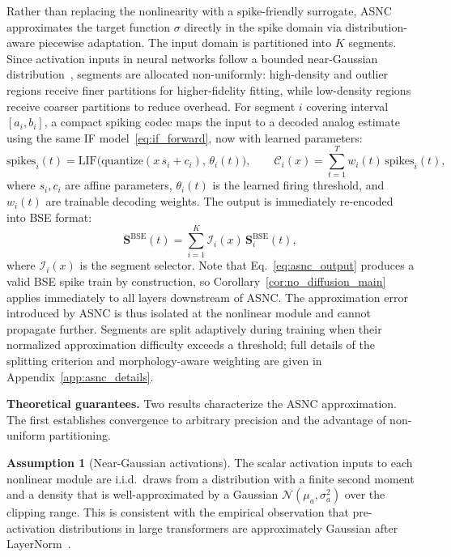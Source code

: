 \documentclass{article}
\theoremstyle{plain}
\theoremstyle{definition}
\newtheorem{assumption}[theorem]{Assumption}
\theoremstyle{remark}
\begin{document}
Rather than replacing the nonlinearity with a spike-friendly surrogate, ASNC
approximates the target function $\sigma$ directly in the spike domain via
distribution-aware piecewise adaptation. The input domain is partitioned into $K$
segments. Since activation inputs in neural networks follow a bounded near-Gaussian
distribution~\citep{he2024understanding,lin2024duquant}, segments are allocated
non-uniformly: high-density and outlier regions receive finer partitions for
higher-fidelity fitting, while low-density regions receive coarser partitions to
reduce overhead. For segment $i$ covering interval $[a_i, b_i]$, a compact spiking
codec maps the input to a decoded analog estimate using the same IF
model~\eqref{eq:if_forward}, now with learned parameters:
\begin{equation}
\label{eq:asnc_codec}
\mathrm{spikes}_i(t)
  = \mathrm{LIF}\!\bigl(\mathrm{quantize}(x\,s_i + c_i),\,\theta_i(t)\bigr),
\qquad
\mathcal{C}_i(x) = \sum_{t=1}^{T} w_i(t)\,\mathrm{spikes}_i(t),
\end{equation}
where $s_i, c_i$ are affine parameters, $\theta_i(t)$ is the learned firing
threshold, and $w_i(t)$ are trainable decoding weights. The output is immediately
re-encoded into BSE format:
\begin{equation}
\label{eq:asnc_output}
\mathbf{S}^{\mathrm{BSE}}(t)
  = \sum_{i=1}^{K} \mathcal{I}_i(x)\,\mathbf{S}^{\mathrm{BSE}}_i(t),
\end{equation}
where $\mathcal{I}_i(x)$ is the segment selector. Note that
Eq.~\eqref{eq:asnc_output} produces a valid BSE spike train by construction, so
Corollary~\ref{cor:no_diffusion_main} applies immediately to all layers downstream of
ASNC. The approximation error introduced by ASNC is thus isolated at the nonlinear
module and cannot propagate further. Segments are split adaptively during training
when their normalized approximation difficulty exceeds a threshold; full details of
the splitting criterion and morphology-aware weighting are given in
Appendix~\ref{app:asnc_details}.

\noindent\textbf{Theoretical guarantees.}
Two results characterize the ASNC approximation. The first establishes convergence
to arbitrary precision and the advantage of non-uniform partitioning.

\begin{assumption}[Near-Gaussian activations]
\label{asm:gaussian_activations}
The scalar activation inputs to each nonlinear module are i.i.d.\ draws from a
distribution with a finite second moment and a density that is well-approximated by a
Gaussian $\mathcal{N}(\mu_a, \sigma_a^2)$ over the clipping range. This is consistent
with the empirical observation that pre-activation distributions in large transformers
are approximately Gaussian after LayerNorm~\citep{he2024understanding,lin2024duquant}.
\end{assumption}
\end{document}
